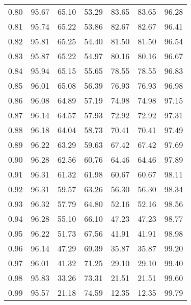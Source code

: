 \begin{tabular}{|c|c|c|c|c|c|c|}
      0.80 &     95.67 &     65.10 &      53.29 &   83.65 &      83.65 &         96.28 \\
      0.81 &     95.74 &     65.22 &      53.86 &   82.67 &      82.67 &         96.41 \\
      0.82 &     95.81 &     65.25 &      54.40 &   81.50 &      81.50 &         96.54 \\
      0.83 &     95.87 &     65.22 &      54.97 &   80.16 &      80.16 &         96.67 \\
      0.84 &     95.94 &     65.15 &      55.65 &   78.55 &      78.55 &         96.83 \\
      0.85 &     96.01 &     65.08 &      56.39 &   76.93 &      76.93 &         96.98 \\
      0.86 &     96.08 &     64.89 &      57.19 &   74.98 &      74.98 &         97.15 \\
      0.87 &     96.14 &     64.57 &      57.93 &   72.92 &      72.92 &         97.31 \\
      0.88 &     96.18 &     64.04 &      58.73 &   70.41 &      70.41 &         97.49 \\
      0.89 &     96.22 &     63.29 &      59.63 &   67.42 &      67.42 &         97.69 \\
      0.90 &     96.28 &     62.56 &      60.76 &   64.46 &      64.46 &         97.89 \\
      0.91 &     96.31 &     61.32 &      61.98 &   60.67 &      60.67 &         98.11 \\
      0.92 &     96.31 &     59.57 &      63.26 &   56.30 &      56.30 &         98.34 \\
      0.93 &     96.32 &     57.79 &      64.80 &   52.16 &      52.16 &         98.56 \\
      0.94 &     96.28 &     55.10 &      66.10 &   47.23 &      47.23 &         98.77 \\
      0.95 &     96.22 &     51.73 &      67.56 &   41.91 &      41.91 &         98.98 \\
      0.96 &     96.14 &     47.29 &      69.39 &   35.87 &      35.87 &         99.20 \\
      0.97 &     96.01 &     41.32 &      71.25 &   29.10 &      29.10 &         99.40 \\
      0.98 &     95.83 &     33.26 &      73.31 &   21.51 &      21.51 &         99.60 \\
      0.99 &     95.57 &     21.18 &      74.59 &   12.35 &      12.35 &         99.79 \\
\bottomrule
\end{tabular}
